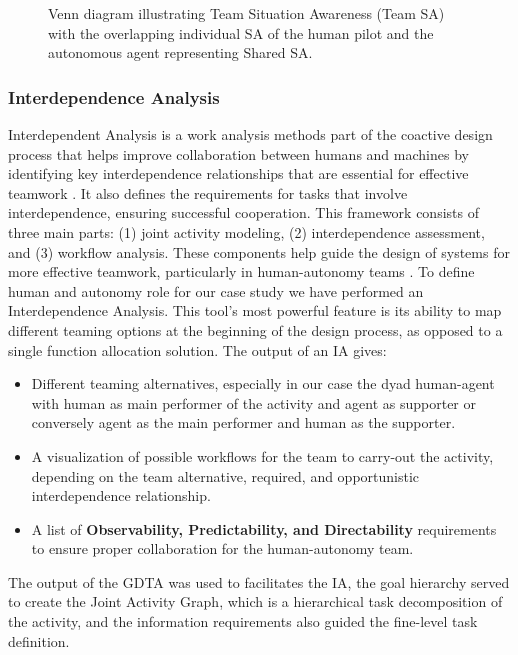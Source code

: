 \documentclass[12pt,a4paper]{article} %
\begin{document}
	\begin{figure}[h!]
		\centering
		\caption{Venn diagram illustrating Team Situation Awareness (Team SA) with the overlapping individual SA of the human pilot and the autonomous agent representing Shared SA.}
		\label{fig:team-sa-venn}
	\end{figure}

	\subsubsection{Interdependence Analysis}
	Interdependent Analysis is a work analysis methods part of the coactive design process that helps improve collaboration between humans and machines by identifying key interdependence relationships that are essential for effective teamwork \parencite{johnson_coactive_2014}. It also defines the requirements for tasks that involve interdependence, ensuring successful cooperation. This framework consists of three main parts: (1) joint activity modeling, (2) interdependence assessment, and (3) workflow analysis. These components help guide the design of systems for more effective teamwork, particularly in human-autonomy teams \parencite{johnson_understanding_2018}.
	To define human and autonomy role for our case study we have performed an Interdependence Analysis. This tool's most powerful feature is its ability to map different teaming options at the beginning of the design process, as opposed to a single function allocation solution. The output of an IA gives:
	\begin{itemize}
		\item Different teaming alternatives, especially in our case the dyad human-agent with human as main performer of the activity and agent as supporter or conversely agent as the main performer and human as the supporter.
		\item A visualization of possible workflows for the team to carry-out the activity, depending on the team alternative, required, and opportunistic interdependence relationship.
		\item A list of \textbf{Observability, Predictability, and Directability} requirements to ensure proper collaboration for the human-autonomy team.
	\end{itemize}
	The output of the GDTA was used to facilitates the IA, the goal hierarchy served to create the Joint Activity Graph, which is a hierarchical task decomposition of the activity, and the information requirements also guided the fine-level task definition.
\end{document}
